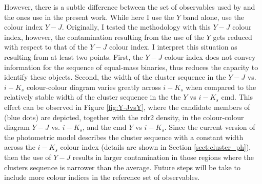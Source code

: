 However, there is a subtle difference between the set of observables used by \cite{Bouy2015} and the ones use in the present work. While here I use the $Y$ band alone, \citet{Bouy2015} use the colour index $Y-J$. Originally, I tested the methodology with this $Y-J$ colour index, however, the contamination resulting from the use of the $Y$ gets reduced with respect to that of the $Y-J$ colour index. I interpret this situation as resulting from at least two points. First, the $Y-J$ colour index does not convey information for the sequence of equal-mass binaries, thus reduces the capacity to identify these objects. Second, the width of the cluster sequence in the $Y-J$ vs. $i-K_s$ colour-colour diagram varies greatly across $i-K_s$ when compared to the relatively stable width of the cluster sequence in the the $Y$ vs $i-K_s$ \gls{cmd}. This effect can be observed in Figure \ref{fig:Y-JvsY}, where the candidate members of \citet{Bouy2015} (blue dots) are depicted, together with the \gls{rdr2} density, in the colour-colour diagram $Y-J$ vs. $i-K_s$, and the  \gls{cmd} $Y$ vs $i-K_s$. Since the current version of the photometric model describes the cluster sequence with a constant width across the $i-K_s$ colour index (details are shown in Section \ref{sect:cluster_ph}), then the use of $Y-J$ results in larger contamination in those regions where the clusters sequence is narrower than the average. Future steps will be take to include more colour indices in the reference set of observables.

